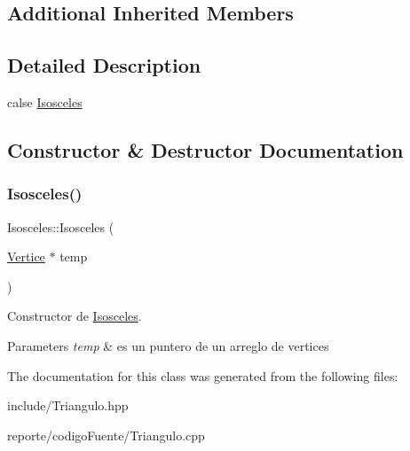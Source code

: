 \subsection*{Additional Inherited Members}


\subsection{Detailed Description}
calse \hyperlink{class_isosceles}{Isosceles} 

\subsection{Constructor \& Destructor Documentation}
\mbox{\label{class_isosceles_a5dc812e7ac02a71016cdc2175176608a}} 
\subsubsection{\texorpdfstring{Isosceles()}{Isosceles()}}
{\footnotesize\ttfamily Isosceles\+::\+Isosceles (\begin{DoxyParamCaption}\item[{\hyperlink{class_vertice}{Vertice} $\ast$}]{temp }\end{DoxyParamCaption})}



Constructor de \hyperlink{class_isosceles}{Isosceles}. 


\begin{DoxyParams}{Parameters}
{\em temp} & es un puntero de un arreglo de vertices \\
\hline
\end{DoxyParams}


The documentation for this class was generated from the following files\+:\begin{DoxyCompactItemize}
\item 
include/Triangulo.\+hpp\item 
reporte/codigo\+Fuente/Triangulo.\+cpp\end{DoxyCompactItemize}
